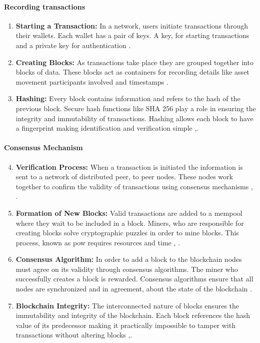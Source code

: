 \paragraph{Recording transactions}

\begin{enumerate}
    \item \textbf{Starting a Transaction:} In a network, users initiate transactions through their wallets. Each wallet has a pair of keys. A key, for starting transactions 
    and a private key for authentication \cite{9596538}.
    \item \textbf{Creating Blocks:} As transactions take place they are grouped together into blocks of data. These blocks act as containers for recording details like 
    asset movement participants involved and timestamps \cite{ibm_blockchain}.
    \item \textbf{Hashing:} Every block contains information and refers to the hash of the previous block. Secure hash functions like SHA 256 play a role in ensuring the 
    integrity and immutability of transactions. Hashing allows each block to have a fingerprint making identification and verification simple \cite{ibm_blockchain} ,\cite{9036241}.
\end{enumerate}

\paragraph{Consensus Mechanism}

\begin{enumerate}
    \setcounter{enumi}{3}
    \item \textbf{Verification Process:} When a transaction is initiated the information is sent to a network of distributed peer, to peer nodes. These nodes work together 
    to confirm the validity of transactions using consensus mechanisms \cite{9036241}, \cite{geeksforgeeks}.
    \item \textbf{Formation of New Blocks:} Valid transactions are added to a \gls{mempool} where they wait to be included in a block. Miners, who are responsible 
    for creating blocks solve cryptographic puzzles in order to mine blocks. This process, known as \gls{pow} requires resources and time \cite{9596538}, \cite{geeksforgeeks}.
    \item \textbf{Consensus Algorithm:} In order to add a block to the blockchain nodes must agree on its validity through consensus algorithms. The miner who successfully 
    creates a block is rewarded. Consensus algorithms ensure that all nodes are synchronized and in agreement, about the state of the blockchain \cite{geeksforgeeks}.
    \item \textbf{Blockchain Integrity:} The interconnected nature of blocks ensures the immutability and integrity of the blockchain. Each block references the hash value 
    of its predecessor making it practically impossible to tamper with transactions without altering blocks \cite{9596538} ,\cite{9036241}.
\end{enumerate}

